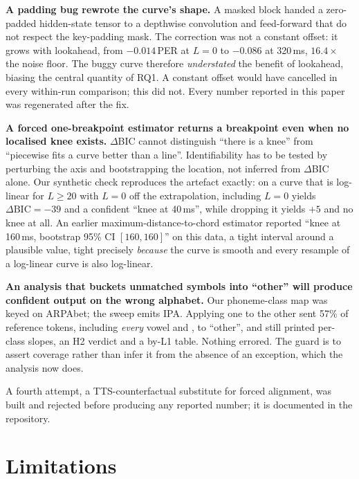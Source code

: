 \documentclass[journal]{IEEEtran}
\begin{document}
\textbf{A padding bug rewrote the curve's shape.} A masked block handed a
zero-padded hidden-state tensor to a depthwise convolution and feed-forward
that do not respect the key-padding mask. The correction was not a constant
offset: it grows with lookahead, from $-0.014$\,PER at $L{=}0$ to $-0.086$
at 320\,ms, $16.4\times$ the noise floor. The buggy curve therefore
\emph{understated} the benefit of lookahead, biasing the central quantity of
RQ1. A constant offset would have cancelled in every within-run comparison;
this did not. Every number reported in this paper was regenerated after the
fix.

\textbf{A forced one-breakpoint estimator returns a breakpoint even when no localised knee
exists.} $\Delta$BIC cannot distinguish ``there is a knee'' from ``piecewise
fits a curve better than a line''. Identifiability has to be tested by
perturbing the axis and bootstrapping the location, not inferred from
$\Delta$BIC alone. Our synthetic check reproduces the artefact exactly: on a
curve that is log-linear for $L\geq20$ with $L{=}0$ off the extrapolation,
including $L{=}0$ yields $\Delta\mathrm{BIC}=-39$ and a confident ``knee at
40\,ms'', while dropping it yields $+5$ and no knee at all. An earlier
maximum-distance-to-chord estimator reported ``knee at 160\,ms, bootstrap 95\%
CI $[160,160]$'' on this data, a tight interval around a plausible value,
tight precisely \emph{because} the curve is smooth and every resample of a
log-linear curve is also log-linear.

\textbf{An analysis that buckets unmatched symbols into ``other'' will produce
confident output on the wrong alphabet.} Our phoneme-class map was keyed on
ARPAbet; the sweep emits IPA. Applying one to the other sent 57\% of reference
tokens, including \emph{every} vowel and , to ``other'',
and still printed per-class slopes, an H2 verdict and a by-L1 table. Nothing
errored. The guard is to assert coverage rather than infer it from the absence
of an exception, which the analysis now does.

A fourth attempt, a TTS-counterfactual substitute for forced alignment, was
built and rejected before producing any reported number; it is documented in
the repository.

\section{Limitations}
\label{sec:remaining}
\end{document}
